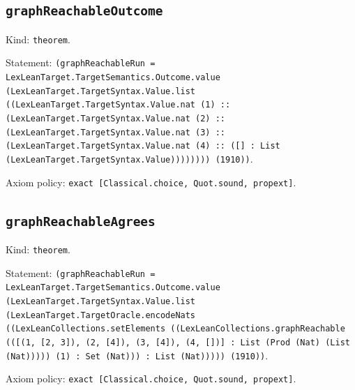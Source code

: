 \documentclass[11pt]{article}
\begin{document}
\subsection*{\texttt{graphReachableOutcome}}
\noindent Kind: \texttt{theorem}.\par
\noindent Statement: \texttt{(graphReachableRun = LexLeanTarget.TargetSemantics.Outcome.value (LexLeanTarget.TargetSyntax.Value.list ((LexLeanTarget.TargetSyntax.Value.nat (1) :: (LexLeanTarget.TargetSyntax.Value.nat (2) :: (LexLeanTarget.TargetSyntax.Value.nat (3) :: (LexLeanTarget.TargetSyntax.Value.nat (4) :: ([] : List (LexLeanTarget.TargetSyntax.Value)))))))) (1910))}.\par
\noindent Axiom policy: \texttt{exact [Classical.choice, Quot.sound, propext]}.\par
\subsection*{\texttt{graphReachableAgrees}}
\noindent Kind: \texttt{theorem}.\par
\noindent Statement: \texttt{(graphReachableRun = LexLeanTarget.TargetSemantics.Outcome.value (LexLeanTarget.TargetSyntax.Value.list (LexLeanTarget.TargetOracle.encodeNats ((LexLeanCollections.setElements ((LexLeanCollections.graphReachable (([(1, [2, 3]), (2, [4]), (3, [4]), (4, [])] : List (Prod (Nat) (List (Nat))))) (1) : Set (Nat))) : List (Nat))))) (1910))}.\par
\noindent Axiom policy: \texttt{exact [Classical.choice, Quot.sound, propext]}.\par
\end{document}
